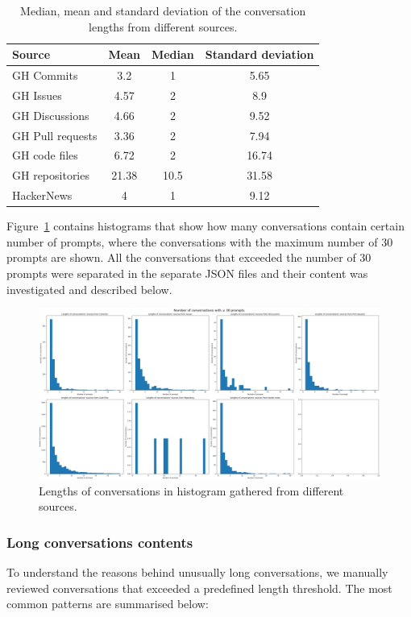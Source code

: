 \begin{table}[H]
\centering
\begin{tabular}{l||c|c|c}
Source           & Mean & Median & Standard deviation \\ \hline
GH Commits       & 3.2   & 1     & 5.65               \\
\hline
GH Issues        & 4.57  & 2     & 8.9                \\
\hline
GH Discussions   & 4.66  & 2     & 9.52               \\
\hline
GH Pull requests & 3.36  & 2     & 7.94               \\
\hline
GH code files    & 6.72  & 2     & 16.74              \\
\hline
GH repositories  & 21.38 & 10.5  & 31.58              \\
\hline
HackerNews       & 4     & 1     & 9.12             
\end{tabular}   
\caption{Median, mean and standard deviation of the conversation lengths from different sources.}
\label{table:conv-lengths} 
\end{table}

Figure~\ref{fig:conv-per-prompt} contains histograms that show how many conversations contain certain number of prompts, where the conversations with the maximum number of 30 prompts are shown. All the conversations that exceeded the number of 30 prompts were separated in the separate JSON files and their content was investigated and described below. 

\begin{figure}[H]
    \centering
    \includegraphics[width=\textwidth]{imgs/conv-per-prompt-nr.png}
    \caption{Lengths of conversations in histogram gathered from different sources.}
    \label{fig:conv-per-prompt}
\end{figure}

\subsubsection{Long conversations contents}
To understand the reasons behind unusually long conversations, we manually reviewed conversations that exceeded a predefined length threshold. The most common patterns are summarised below:

